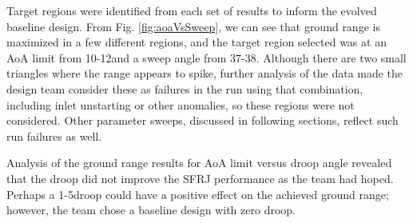 Target regions were identified from each set of results to inform the evolved baseline design. From Fig. \ref{fig:aoaVsSweep}, we can see that ground range is maximized in a few different regions, and the target region selected was at an AoA limit from 10-12\textdegree and a sweep angle from 37-38\textdegree. Although there are two small triangles where the range appears to spike, further analysis of the data made the design team consider these as failures in the run using that combination, including inlet unstarting or other anomalies, so these regions were not considered. Other parameter sweeps, discussed in following sections, reflect such run failures as well.

Analysis of the ground range results for AoA limit versus droop angle revealed that the droop did not improve the SFRJ performance as the team had hoped. Perhaps a 1-5\textdegree droop could have a positive effect on the achieved ground range; however, the team chose a baseline design with zero droop. 